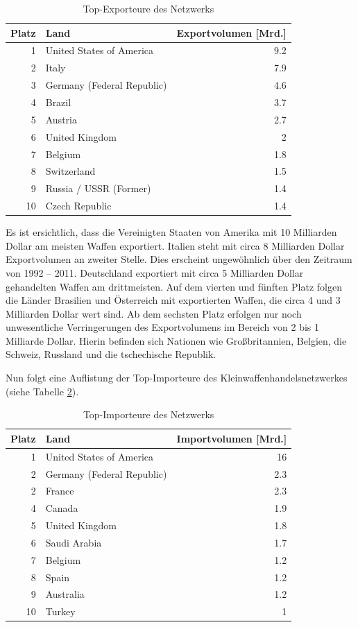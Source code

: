 \documentclass[a4paper,ngerman,oneside,titlepage,bibliography=totoc,11pt]{scrreprt}
\begin{document}
\begin{table}[h]
\centering
\footnotesize
\begin{tabular}{rlr}
  \hline
 Platz & Land & Exportvolumen [Mrd.]\\ 
  \hline
1 & United States of America & 9.2\\ 
  2 & Italy & 7.9 \\ 
  3 & Germany (Federal Republic) & 4.6 \\ 
  4 & Brazil & 3.7 \\ 
  5 & Austria & 2.7 \\ 
  6 & United Kingdom & 2 \\ 
  7 & Belgium & 1.8 \\ 
  8 & Switzerland & 1.5 \\ 
  9 & Russia / USSR (Former) & 1.4 \\ 
  10 & Czech Republic & 1.4 \\ 
   \hline
\end{tabular}
\caption{Top-Exporteure des Netzwerks} 
\label{top_exp}
	\end{table}
	
Es ist ersichtlich, dass die Vereinigten Staaten von Amerika mit 10 Milliarden Dollar am meisten Waffen exportiert. Italien steht mit circa 8 Milliarden Dollar Exportvolumen an zweiter Stelle. Dies erscheint ungewöhnlich über den Zeitraum von 1992 -- 2011. Deutschland exportiert mit circa 5 Milliarden Dollar gehandelten Waffen am drittmeisten. Auf dem vierten und fünften Platz folgen die Länder Brasilien und Österreich mit exportierten Waffen, die circa 4 und 3 Milliarden Dollar wert sind. Ab dem sechsten Platz erfolgen nur noch unwesentliche Verringerungen des Exportvolumens im Bereich von 2 bis 1 Milliarde Dollar. Hierin befinden sich Nationen wie Großbritannien, Belgien, die Schweiz, Russland und die tschechische Republik. 

Nun folgt eine Auflistung der Top-Importeure des Kleinwaffenhandelsnetzwerkes (siehe Tabelle \ref{top_imp}).

\begin{table}[h]
\centering
\footnotesize
\begin{tabular}{rlr}
  \hline
 Platz & Land & Importvolumen [Mrd.]\\ 
  \hline
1 & United States of America & 16\\ 
  2 & Germany (Federal Republic) & 2.3\\ 
  2 & France & 2.3\\ 
  4 & Canada & 1.9 \\ 
  5 & United Kingdom & 1.8\\ 
  6 & Saudi Arabia & 1.7\\ 
  7 & Belgium & 1.2\\ 
  8 & Spain & 1.2\\ 
  9 & Australia & 1.2\\ 
  10 & Turkey & 1\\ 
   \hline
\end{tabular}
\caption{Top-Importeure des Netzwerks} 
\label{top_imp}
	\end{table}
		
\end{document}
